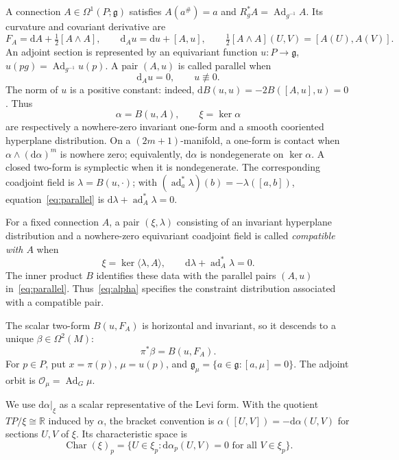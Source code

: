 \documentclass[11pt,a4paper]{article}
\numberwithin{equation}{section}
\theoremstyle{definition}
\theoremstyle{remark}
\newcommand{\g}{\mathfrak g}
\newcommand{\D}{\xi}
\newcommand{\Ad}{\operatorname{Ad}}
\newcommand{\Char}{\operatorname{Char}}
\newcommand{\R}{\mathbb R}
\newcommand{\dd}{\mathrm d}
\DeclareMathOperator{\ad}{ad}
\begin{document}
A connection $A\in\Omega^1(P;\g)$ satisfies
$A(a^\#)=a$ and $R_g^*A=\Ad_{g^{-1}}A$. Its curvature and covariant derivative
are
\begin{equation}\label{eq:conventions}
 F_A=\dd A+\tfrac12[A\wedge A],\qquad
 \dd_Au=\dd u+[A,u],\qquad
 \tfrac12[A\wedge A](U,V)=[A(U),A(V)].
\end{equation}
An adjoint section is represented by an equivariant function
$u:P\to\g$, $u(pg)=\Ad_{g^{-1}}u(p)$. A pair $(A,u)$ is called parallel when
\begin{equation}\label{eq:parallel}
 \dd_Au=0,\qquad u\not\equiv0.
\end{equation}
The norm of $u$ is a positive constant: indeed,
$\dd B(u,u)=-2B([A,u],u)=0$. Thus
\begin{equation}\label{eq:alpha}
 \alpha=B(u,A),\qquad \D=\ker\alpha
\end{equation}
are respectively a nowhere-zero invariant one-form and a smooth cooriented
hyperplane distribution. On a $(2m+1)$-manifold, a one-form is contact
when $\alpha\wedge(\dd\alpha)^m$ is nowhere zero; equivalently,
$\dd\alpha$ is nondegenerate on $\ker\alpha$.
A closed two-form is symplectic when it is nondegenerate. The corresponding coadjoint field is
$\lambda=B(u,\cdot)$; with
$(\ad_a^*\lambda)(b)=-\lambda([a,b])$, equation~\eqref{eq:parallel} is
$\dd\lambda+\ad_A^*\lambda=0$.

For a fixed connection $A$, a pair $(\xi,\lambda)$ consisting of an
invariant hyperplane distribution and a nowhere-zero equivariant
coadjoint field is called \emph{compatible with $A$} when
\[
 \xi=\ker\langle\lambda,A\rangle,\qquad
 \dd\lambda+\ad_A^*\lambda=0.
\]
The inner product $B$ identifies these data with the parallel pairs
$(A,u)$ in~\eqref{eq:parallel}. Thus~\eqref{eq:alpha} specifies the
constraint distribution associated with a compatible pair.

The scalar two-form $B(u,F_A)$ is horizontal and invariant, so it descends to a
unique $\beta\in\Omega^2(M)$:
\begin{equation}\label{eq:beta}
 \pi^*\beta=B(u,F_A).
\end{equation}
For $p\in P$, put $x=\pi(p)$, $\mu=u(p)$, and
$\g_\mu=\{a\in\g:[a,\mu]=0\}$. The adjoint orbit is
$\mathcal O_\mu=\Ad_G\mu$.

We use $\dd\alpha|_\D$ as a scalar representative of the Levi form.
With the quotient $TP/\D\cong\R$ induced by $\alpha$, the bracket convention
is $\alpha([U,V])=-\dd\alpha(U,V)$ for sections $U,V$ of $\D$.
Its characteristic space is
\[
 \Char(\D)_p=\{U\in\D_p:\dd\alpha_p(U,V)=0\text{ for all }V\in\D_p\}.
\]
\end{document}
